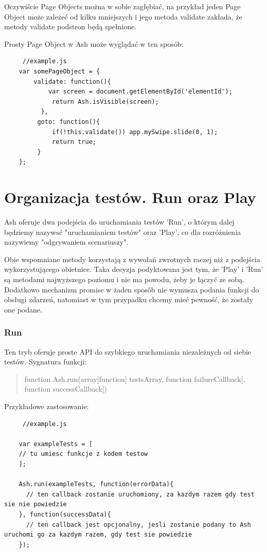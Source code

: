 \documentclass[brudnopis]{xmgr}
\begin{document}
Oczywiście Page Objects można w sobie zagłębiać, na przykład jeden Page Object może zależeć od kilku mniejszych i jego metoda validate zakłada, że metody validate podstron będą spełnione. 

Prosty Page Object w Ash może wyglądać w ten sposób:

\begin{lstlisting}
     //example.js
    var somePageObject = {
    	validate: function(){
      	    var screen = document.getElementById('elementId');
             return Ash.isVisible(screen);
          },
         goto: function(){
             if(!this.validate()) app.mySwipe.slide(0, 1);
             return true;
         }
    };
\end{lstlisting}

\section{Organizacja testów. Run oraz Play}

Ash oferuje dwa podejścia do uruchamiania testów 'Run', o którym dalej będziemy nazywać "uruchamianiem testów" oraz 'Play', co dla rozróżnienia nazywiemy "odgrywaniem scenariuszy".

Obie wspomniane metody korzystają z wywołań zwrotnych raczej niż z podejścia wykorzystującego obietnice. Taka decyzja podyktowana jest tym, że 'Play' i 'Run' są  metodami najwyższego poziomu i nie ma powodu, żeby je łączyć ze sobą. Dodatkowo mechanizm promise w żaden sposób nie wymusza podania funkcji do obsługi zdarzeń, natomiast w tym przypadku chcemy mieć pewność, że zostały one podane.  

\subsubsection{Run}

Ten tryb oferuje proste API do szybkiego uruchamiania niezależnych od siebie testów. Sygnatura funkcji: 

\begin{quote}
function Ash.run(array[function] testsArray, function failureCallback[, function successCallback]) 
\end{quote}

Przykładowe zastosowanie: 

\begin{lstlisting}
     //example.js

    var exampleTests = [
	// tu umiesc funkcje z kodem testow
    ];

    Ash.run(exampleTests, function(errorData){
      // ten callback zostanie uruchomiony, za kazdym razem gdy test sie nie powiedzie
    }, function(successData){
      // ten callback jest opcjonalny, jesli zostanie podany to Ash uruchomi go za kazdym razem, gdy test sie powiedzie
    });
\end{lstlisting}
\end{document}
